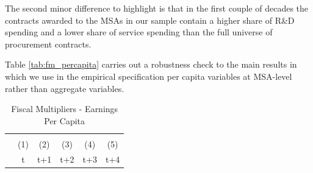 \documentclass[dv_diss_main.tex]{subfiles}
\begin{document}
The second minor difference to highlight is that in the first couple of decades the contracts awarded to the MSAs in our sample contain a higher share of R\&D spending and a lower share of service spending than the full universe of procurement contracts.

\newpage 

Table \ref{tab:fm_percapita} carries out a robustness check to the main results in which we use in the empirical specification  per capita variables at MSA-level rather than aggregate variables.

\begin{table}[H]
    \begin{center}
    \caption{Fiscal Multipliers - Earnings Per Capita}
    \begin{tabular}{lccccc} \hline
    \vspace{-2pt} & \vspace{-2pt} & \vspace{-2pt} & \vspace{-2pt} & \vspace{-2pt} \\
     & (1) & (2) & (3) & (4) & (5) \\
     & t & t+1 & t+2 & t+3 & t+4 \\ 


\end{tabular}
\end{center}
\end{table}
\end{document}
